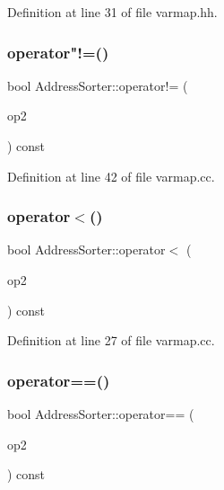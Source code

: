Definition at line 31 of file varmap.\+hh.

\mbox{\label{class_address_sorter_a6e2a2206ab7fa9963d0320be1894abe5}} 
\subsubsection{\texorpdfstring{operator"!=()}{operator!=()}}
{\footnotesize\ttfamily bool Address\+Sorter\+::operator!= (\begin{DoxyParamCaption}\item[{const \mbox{\hyperlink{class_address_sorter}{Address\+Sorter}} \&}]{op2 }\end{DoxyParamCaption}) const}



Definition at line 42 of file varmap.\+cc.

\mbox{\label{class_address_sorter_a39619f7c017c835970a787456f25ea8b}} 
\subsubsection{\texorpdfstring{operator$<$()}{operator<()}}
{\footnotesize\ttfamily bool Address\+Sorter\+::operator$<$ (\begin{DoxyParamCaption}\item[{const \mbox{\hyperlink{class_address_sorter}{Address\+Sorter}} \&}]{op2 }\end{DoxyParamCaption}) const}



Definition at line 27 of file varmap.\+cc.

\mbox{\label{class_address_sorter_aefa864376ccabda90c574d52f7d023d9}} 
\subsubsection{\texorpdfstring{operator==()}{operator==()}}
{\footnotesize\ttfamily bool Address\+Sorter\+::operator== (\begin{DoxyParamCaption}\item[{const \mbox{\hyperlink{class_address_sorter}{Address\+Sorter}} \&}]{op2 }\end{DoxyParamCaption}) const}



